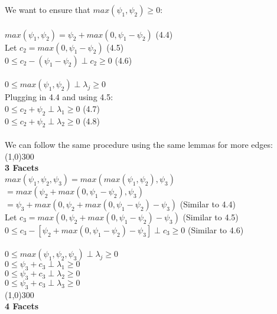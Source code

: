 \documentclass{article}
\begin{document}
We want to ensure that $max(\psi_1,\psi_2) \geq 0$:  \\ \\
$max(\psi_1, \psi_2) = \psi_2 + max(0, \psi_1 - \psi_2)$ \hspace{6mm}(4.4)  \\
Let $c_2 = max(0,\psi_1 - \psi_2)$ \hspace{2.4cm}(4.5) \\
$0 \leq c_2 - (\psi_1 - \psi_2) \perp c_2 \geq 0$ \hspace{2cm}(4.6) \\  \\
$0 \leq max(\psi_1, \psi_2) \perp \lambda_j \geq 0 $ \\
Plugging in 4.4 and using 4.5: \\
$0 \leq c_2 + \psi_2 \perp \lambda_1 \geq 0$ \hspace{3cm}(4.7) \\
$0 \leq c_2 + \psi_2 \perp \lambda_2 \geq 0$  \hspace{3cm}(4.8) \\ \\
We can follow the same procedure using the same lemmas for more edges: \\ 
\line(1,0){300} \\  \textbf{3 Facets} \\
$max(\psi_1,\psi_2, \psi_3) = max(max(\psi_1,\psi_2),\psi_3)$ \\
$= max(\psi_2 + max(0,\psi_1-\psi_2), \psi_3)$  \\
$= \psi_3 + max(0, \psi_2 + max(0,\psi_1-\psi_2) - \psi_3)$  \hspace{10mm} (Similar to 4.4) \\
Let $c_3 = max(0,\psi_2 + max(0, \psi_1 - \psi_2) - \psi_3)$\hspace{9mm} (Similar to 4.5)  \\
$0 \leq c_3 - [\psi_2 + max(0, \psi_1 - \psi_2) - \psi_3] \perp c_3 \geq 0$  \hspace{5mm} (Similar to 4.6) \\ \\
$0 \leq max(\psi_1, \psi_2, \psi_3) \perp \lambda_j \geq 0$ \\
$0 \leq \psi_3 + c_3 \perp \lambda_1 \geq 0$ \\
$0 \leq \psi_3 + c_3 \perp \lambda_2 \geq 0$ \\
$0 \leq \psi_3 + c_3 \perp \lambda_3 \geq 0$ \\
\line(1,0){300} \\  \textbf{4 Facets} \\
\end{document}
